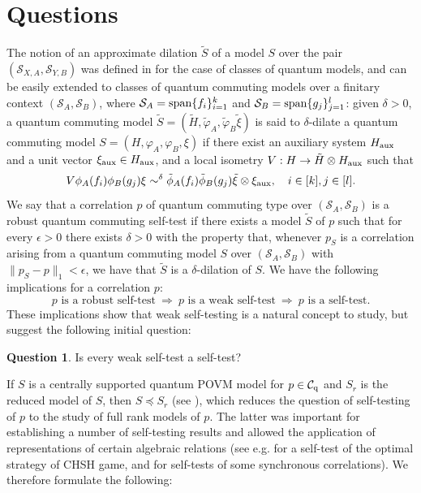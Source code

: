 \documentclass[11pt]{amsart}
\theoremstyle{definition}
\newtheorem{question}[theorem]{Question}
\newcommand\nph{\varphi}
\newcommand{\cl}[1]{\mathcal{#1}}
\begin{document}


\section{Questions}\label{s_questions}


The notion of an approximate dilation $\tilde{S}$ of a model $S$
over the pair $(\cl S_{X,A},\cl S_{Y,B})$ was defined in 
\cite{zhao} for the case of classes of quantum models, 
and can be easily extended to classes of quantum 
commuting models over
a finitary context $(\cl S_A,\cl S_B)$,
where $\cl S_A = {\rm span}\{f_i\}_{i=1}^k$ and 
$\cl S_B = {\rm span}\{g_j\}_{j=1}^l$:
given $\delta > 0$, a quantum commuting model 
$\tilde{S} = (\tilde{H},\tilde{\nph}_A,\tilde{\nph}_B\tilde{\xi})$ is said to $\delta$-dilate a quantum commuting 
model $S = (H,\nph_A,\nph_B,\xi)$ if there exist 
an auxiliary system $H_{\rm aux}$ and a unit vector 
$\xi_{\rm aux}\in H_{\rm aux}$, and 
a local isometry $V : H\to \tilde{H}\otimes H_{\rm aux}$ 
such that 
$$V\phi_A(f_i)\phi_B(g_j)\xi\sim^{\delta} 
\tilde{\phi}_A(f_i)\tilde{\phi}_B(g_j)\tilde{\xi}
\otimes\xi_{\rm aux}, \ \ \ i\in [k], j\in [l]. $$
We say that a correlation $p$ of quantum commuting type 
over $(\cl S_A,\cl S_B)$ is a robust 
quantum commuting self-test if there exists a model 
$\tilde{S}$ of $p$ such that for every $\epsilon > 0$
there exists $\delta > 0$ with the property that, whenever 
$p_S$ is a correlation arising from a quantum commuting model 
$S$ over $(\cl S_A,\cl S_B)$ with $\|p_S - p\|_1 < \epsilon$, 
we have that $\tilde{S}$ is a $\delta$-dilation of $S$. 
We have the following implications for 
a correlation $p$: 
$$p \mbox{ is a robust self-test} \ \Rightarrow \ 
p \mbox{ is a weak self-test} \ \Rightarrow \ 
p \mbox{ is a self-test}.
$$
These implications show that weak self-testing 
is a natural concept to study, but suggest the following 
initial question:

\begin{question}\label{q_weak}
\rm
Is every weak self-test a self-test?
\end{question}


If $S$ is a centrally supported quantum POVM model for $p\in\cl C_{\rm q}$ and $S_r$ is the reduced model of $S$, then $S\preceq S_r$ (see \cite[Lemma 4.2]{pszz}), which reduces the question of self-testing of $p$ to the study of full rank models of $p$. The latter was important for establishing a number of self-testing results and allowed the application of  representations of certain algebraic relations (see e.g. \cite{supic-bowles} for a self-test of the optimal strategy of CHSH game, and \cite{mps} for self-tests of some synchronous correlations). We therefore formulate the following:
\end{document}
